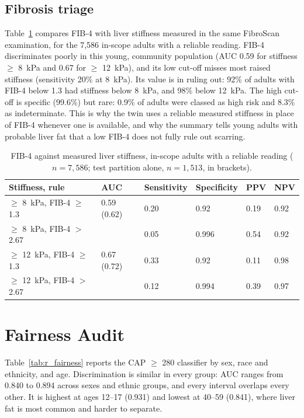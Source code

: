 \subsection{Fibrosis triage}

Table~\ref{tab:r_fib4} compares FIB-4 with liver stiffness measured in the
same FibroScan examination, for the 7{,}586 in-scope adults with a reliable
reading. FIB-4 discriminates poorly in this young, community population (AUC
0.59 for stiffness $\geq$ 8~kPa and 0.67 for $\geq$ 12~kPa), and its low
cut-off misses most raised stiffness (sensitivity 20\% at 8~kPa). Its value is
in ruling out: 92\% of adults with FIB-4 below 1.3 had stiffness below
8~kPa, and 98\% below 12~kPa. The high cut-off is specific (99.6\%) but rare:
0.9\% of adults were classed as high risk and 8.3\% as indeterminate. This is
why the twin uses a reliable measured stiffness in place of FIB-4 whenever one
is available, and why the summary tells young adults with probable liver fat
that a low FIB-4 does not fully rule out scarring.

\begin{table}[htbp]
\centering
\caption{FIB-4 against measured liver stiffness, in-scope adults with a reliable reading ($n = 7{,}586$; test partition alone, $n = 1{,}513$, in brackets).}
\label{tab:r_fib4}
\begin{tabular}{p{3.6cm}p{1.9cm}p{1.9cm}p{1.9cm}p{1.9cm}p{1.9cm}}
\toprule
Stiffness, rule & AUC & Sensitivity & Specificity & PPV & NPV \\
\midrule
$\geq$ 8~kPa, FIB-4 $\geq$ 1.3 & 0.59 (0.62) & 0.20 & 0.92 & 0.19 & 0.92 \\
$\geq$ 8~kPa, FIB-4 $>$ 2.67 & & 0.05 & 0.996 & 0.54 & 0.92 \\
$\geq$ 12~kPa, FIB-4 $\geq$ 1.3 & 0.67 (0.72) & 0.33 & 0.92 & 0.11 & 0.98 \\
$\geq$ 12~kPa, FIB-4 $>$ 2.67 & & 0.12 & 0.994 & 0.39 & 0.97 \\
\bottomrule
\end{tabular}
\end{table}

\section{Fairness Audit}
\label{sec:r_fairness}

Table~\ref{tab:r_fairness} reports the CAP $\geq$ 280 classifier by sex, race
and ethnicity, and age. Discrimination is similar in every group: AUC ranges
from 0.840 to 0.894 across sexes and ethnic groups, and every interval
overlaps every other. It is highest at ages 12--17 (0.931) and lowest at
40--59 (0.841), where liver fat is most common and harder to separate.

